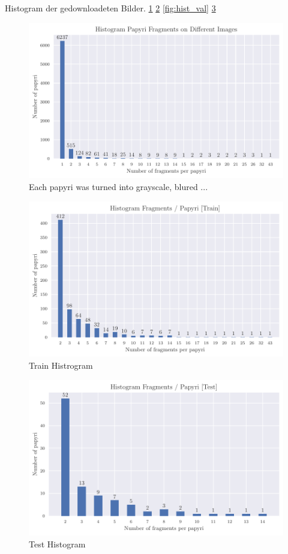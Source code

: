 Histogram der gedownloadeten Bilder. \ref{fig:hist_orginal} \ref{fig:hist_train} \ref{fig:hist_val} \ref{fig:hist_test}

\begin{figure}[t]
	\label{fig:hist_orginal}
	\includegraphics[width=\textwidth]{figures/HistogramFragOriginal.pdf}
	\caption{Each papyri was turned into grayscale, blured ...}
\end{figure}

\begin{figure}[t]
	\label{fig:hist_train}
	\includegraphics[width=\textwidth]{figures/HistogramFragAfterTrain.pdf}
	\caption{Train Histrogram}
\end{figure}

\begin{figure}[t]
	\label{fig:hist_test}
	\includegraphics[width=\textwidth]{figures/HistogramFragTest.pdf}
	\caption{Test Histogram}
\end{figure}

